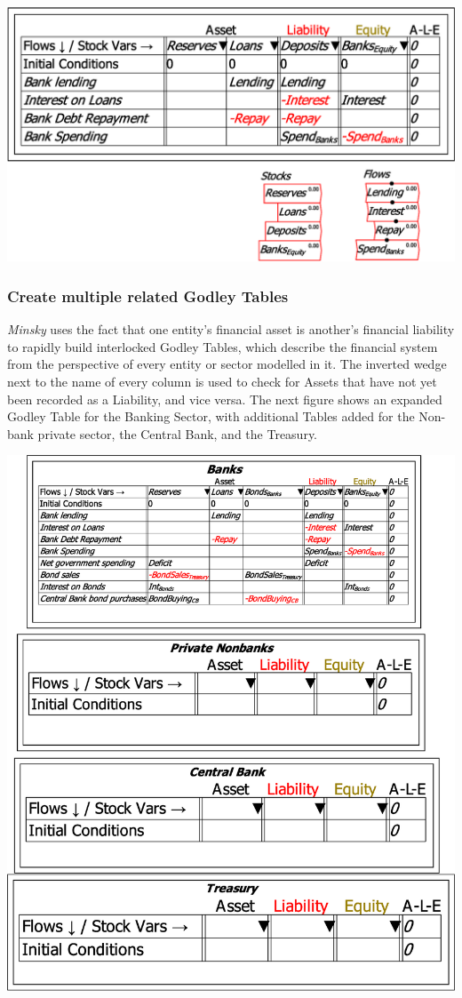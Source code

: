 \noindent\includegraphics[width=\textwidth]{images/GodleyTableImagesStocksFlowsOnCanvas}

\subsubsection{Create multiple related Godley Tables}

\emph{Minsky} uses the fact that one entity's financial asset is another's
financial liability to rapidly build interlocked Godley Tables, which
describe the financial system from the perspective of every entity
or sector modelled in it. The inverted wedge 
next to the name of every column is used to check for Assets that
have not yet been recorded as a Liability, and vice versa. The next
figure shows an expanded Godley Table for the Banking Sector, with
additional Tables added for the Non-bank private sector, the Central
Bank, and the Treasury.

\noindent\includegraphics[width=\textwidth]{images/GodleyTableImagesMultiTablesUnfinished}

